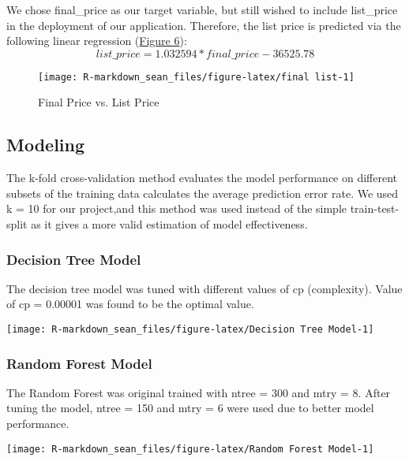 \documentclass[11pt,]{article}
\begin{document}
We chose final\_price as our target variable, but still wished to
include list\_price in the deployment of our application. Therefore, the
list price is predicted via the following linear regression
(\hyperref[sec:fig6]{Figure 6}):
\[list\_price = 1.032594 * final\_price - 36525.78\]

\begin{figure}

{\centering \texttt{[image: R-markdown\_sean\_files/figure-latex/final list-1]} 

}

\caption{Final Price vs. List Price\label{sec:fig6}}\label{fig:final list}
\end{figure}
\newpage

\hypertarget{modeling-1}{%
\subsection{Modeling}\label{modeling-1}}

The k-fold cross-validation method evaluates the model performance on
different subsets of the training data calculates the average prediction
error rate. We used k = 10 for our project,and this method was used
instead of the simple train-test-split as it gives a more valid
estimation of model effectiveness.

\hypertarget{decision-tree-model}{%
\subsubsection{Decision Tree Model}\label{decision-tree-model}}

The decision tree model was tuned with different values of cp
(complexity). Value of cp = 0.00001 was found to be the optimal value.

\begin{center}\texttt{[image: R-markdown\_sean\_files/figure-latex/Decision Tree Model-1]} \end{center}

\hypertarget{random-forest-model}{%
\subsubsection{Random Forest Model}\label{random-forest-model}}

The Random Forest was original trained with ntree = 300 and mtry = 8.
After tuning the model, ntree = 150 and mtry = 6 were used due to better
model performance.

\begin{center}\texttt{[image: R-markdown\_sean\_files/figure-latex/Random Forest Model-1]} \end{center}
\end{document}
